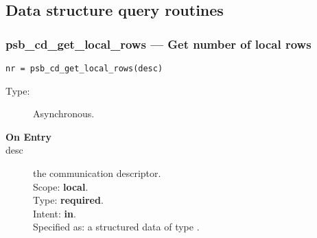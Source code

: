 

\subsection{Data structure query routines}
\label{sec:dataquery}
\subsubsection*{psb\_cd\_get\_local\_rows --- Get number of local rows}

\begin{verbatim}
nr = psb_cd_get_local_rows(desc)
\end{verbatim}

\begin{description}
\item[Type:] Asynchronous.
\item[\bf On Entry]
\item[desc] the communication descriptor.\\
Scope: {\bf local}.\\
Type: {\bf required}.\\
Intent: {\bf in}.\\
Specified as: a structured data of type \descdata.
\end{description}

